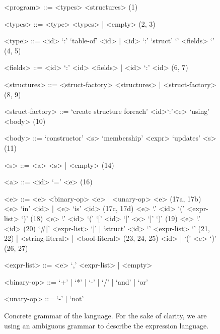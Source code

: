 {
\scriptsize
\begin{figure}[!ht]
\begin{mdframed}[outermargin=0.2cm, innermargin=0.5cm]

\newcommand{\grule}[1]{\hfill{\scriptsize (#1)}}
\setlength{\grammarindent}{5em}
\begin{grammar}

<program> ::= <types> <structures> \grule{1}

<types> ::= <type> <types> | <empty> \grule{2, 3}

<type> ::= <id> `:' `table-of' <id> | <id> `:' `struct' `{' <fields> `}' \grule{4, 5}

<fields> ::= <id> `:' <id> <fields> | <id> `:' <id> \grule{6, 7}

<structures> ::= <struct-factory> <structures> | <struct-factory> \grule{8, 9}

<struct-factory> ::= `create structure foreach' <id>`:'<e> `using' <body> \grule{10}


<body> ::= `constructor' <s> `membership' <expr> `updates' <s> \grule{11}




<s> ::= <a> <s> | <empty> \grule{14}

<a> ::= <id> `=' <e>  \grule{16} 

<e> ::= <e> <binary-op> <e> | <unary-op> <e> \grule{17a, 17b}
\alt <e> `in' <id> | <e> `is' <id> \grule{17c, 17d}
\alt <e> `.' <id> `(' <expr-list> `)' \grule{18}
\alt <e> `.' <id> `(' `[' <id> `|' <s> `]' `)' \grule{19}
\alt <e> `.' <id> \grule{20}
\alt `#[' <expr-list> `]' | `struct' <id> `{' <expr-list> `}' \grule{21, 22}
 | <string-literal> | <bool-literal> \grule{23, 24, 25}
\alt <id> | `(' <e> `)' \grule{26, 27}

<expr-list> ::= <e> `,' <expr-list> | <empty> 

<binary-op> ::= `+' | `*' | `-' | `/' | `and' | `or'

<unary-op> ::= `-' | `not'

\end{grammar}
\end{mdframed}
\caption{Concrete grammar of the language. For the sake of clarity, we are using an ambiguous grammar to describe the expression language.} \label{fig:dsl-grammar}
\end{figure}
}

